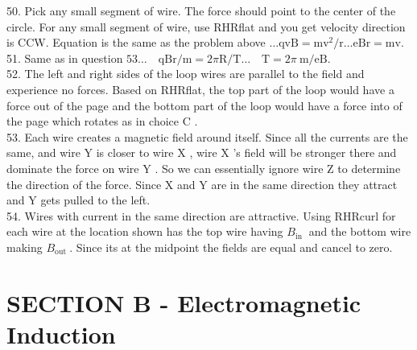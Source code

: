 \begin{enumerate}
50. Pick any small segment of wire. The force should point to the center of the circle. For any small segment of wire, use RHRflat and you get velocity direction is CCW. Equation is the same as the problem above $\ldots \mathrm{qvB}=\mathrm{mv}^{2} / \mathrm{r} \ldots \mathrm{eBr}=\mathrm{mv}$.\\
51. Same as in question $53 \ldots \quad \mathrm{qBr} / \mathrm{m}=2 \pi \mathrm{R} / \mathrm{T} \ldots \quad \mathrm{T}=2 \pi \mathrm{~m} / \mathrm{eB}$.\\
52. The left and right sides of the loop wires are parallel to the field and experience no forces. Based on RHRflat, the top part of the loop would have a force out of the page and the bottom part of the loop would have a force into of the page which rotates as in choice C .\\
53. Each wire creates a magnetic field around itself. Since all the currents are the same, and wire Y is closer to wire X , wire X 's field will be stronger there and dominate the force on wire Y . So we can essentially ignore wire Z to determine the direction of the force. Since X and Y are in the same direction they attract and Y gets pulled to the left.\\
54. Wires with current in the same direction are attractive. Using RHRcurl for each wire at the location shown has the top wire having $B_{\text {in }}$ and the bottom wire making $B_{\text {out }}$. Since its at the midpoint the fields are equal and cancel to zero.

\section*{SECTION B - Electromagnetic Induction}

\end{enumerate}
